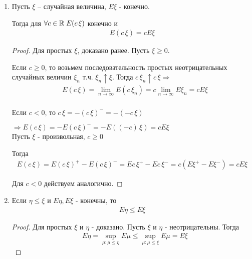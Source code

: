 \begin{enumerate}[label=\protect\circled{\arabic*},series=mean_properties]

  \item
    Пусть $\xi$ -- случайная величина, $E \xi$ - конечно.

    Тогда для $\forall c \in \mathbb{R} \; E(c\,\xi)$ конечно и
    \begin{align*}
      E(c\,\xi) = c E \xi
    \end{align*}

    \begin{proof}
      Для простых $\xi$, доказано ранее. Пусть $\xi \geq 0$. 

      Если $c \geq 0$, то возьмем последовательность простых неотрицательных 
      случайных величин $\xi_n$ т.ч. $\xi_n \uparrow \xi$.
      Тогда $c\, \xi_n \uparrow c\, \xi \Rightarrow$
      \begin{align*}
        &E (c\,\xi) = \lim_{n \to \infty} E(c\,\xi_n) = 
        c \lim_{n \to \infty} E \xi_n = c E \xi\\
      \end{align*}

      Если $c < 0$, то $c\,\xi = - (c\,\xi)^- = -(-c\,\xi)$

      $\Rightarrow E(c\,\xi) = - E(c\,\xi)^- = - E((-c)\,\xi) = c E \xi$\\

      Пусть $\xi$ - произвольная, $c \geq 0$

      Тогда 
      \begin{align*}
        E(c\,\xi) = E(c\,\xi)^+ - E(c\,\xi)^- = 
        E c\,\xi^+ - E c\,\xi^- = c (E \xi^+ - E \xi^-) = c E \xi
      \end{align*}


      Для $c < 0$ действуем аналогично.
    \end{proof}

  \item
    Если $\eta \leq \xi$ и $E \eta, E\xi$ - конечны, то 
    \begin{align*}
      E \eta \leq E \xi
    \end{align*}

    \begin{proof}
      Для простых $\xi$ и $\eta$ - доказано. Пусть $\xi$ и $\eta$ - неотрицательны. 
      Тогда
      \begin{align*}
        &E \eta = \sup_{\mu : \mu \leq \eta} E \mu
        \leq \sup_{\mu : \mu \leq \xi} E \mu = E \xi
      \end{align*}


\end{proof}
\end{enumerate}
